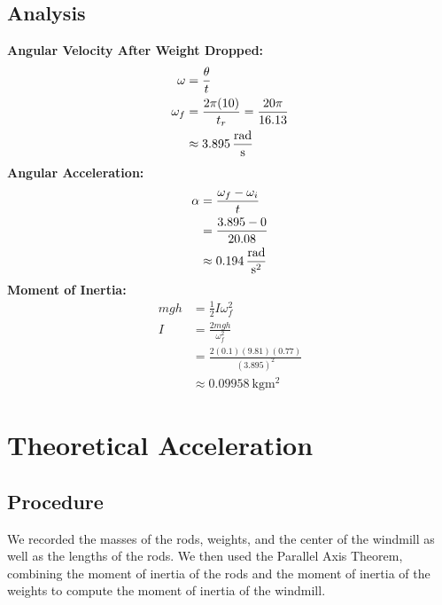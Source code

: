\documentclass[article, 11pt]{article}
\begin{document}
    \subsection{Analysis}
    \textbf{Angular Velocity After Weight Dropped:}
    \begin{align*}
        \omega   &= \frac{\theta}{t}  \\
        \omega_f &= \frac{2\pi(10)}{t_r} = \frac{20\pi}{16.13} \\
                 &\approx \SI{3.895}{\frac{\radian}{\second}}
    \end{align*}
    \textbf{Angular Acceleration:}
    \begin{align*}
        \alpha &= \frac{\omega_f - \omega_i}{t} \\
               &= \frac{3.895 - 0}{20.08} \\
               &\approx \SI{0.194}{\frac{\radian}{\second^2}}
    \end{align*}
    \textbf{Moment of Inertia:}
    \begin{align*}
        mgh &= \frac{1}{2}I\omega_f^2 \\
        I   &= \frac{2mgh}{\omega_f^2} \\
            &= \frac{2(0.1)(9.81)(0.77)}{(3.895)^2} \\
            &\approx \SI{0.09958}{\kilogram\meter^2}
    \end{align*}

    \section{Theoretical Acceleration}
    \subsection{Procedure}
    \noindent
    We recorded the masses of the rods, weights, and the center of the windmill as well as the lengths of the rods. We then used the Parallel Axis Theorem, combining the moment of inertia of the rods and the moment of inertia of the weights to compute the moment of inertia of the windmill.
\end{document}
